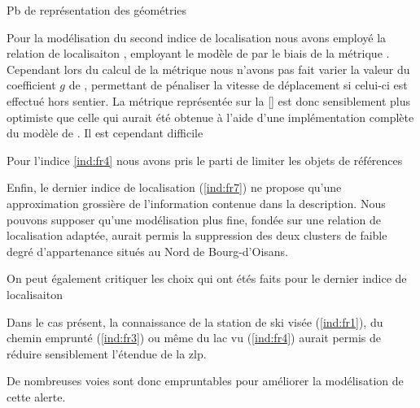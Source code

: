 Pb de représentation des géométries

Pour la modélisation du second indice de localisation nous avons
employé la relation de localisaiton
, employant le modèle de
\textcite{Tobler1993} par le biais de la métrique
. Cependant lors du calcul de la métrique
nous n'avons pas fait varier la valeur du coefficient \(g\) de
\textcite{Tobler1993}, permettant de pénaliser la vitesse de
déplacement si celui-ci est effectué hors sentier. La métrique
représentée sur la \autoref{} est donc sensiblement plus optimiste que
celle qui aurait été obtenue à l'aide d'une implémentation complète du
modèle de \textcite{Tobler1993}.
%
Il est cependant difficile

Pour l'indice \ref{ind:fr4} nous avons pris le parti de limiter les
objets de références

Enfin, le dernier indice de localisation (\ref{ind:fr7}) ne propose
qu'une approximation grossière de l'information contenue dans la
description.
%
Nous pouvons supposer qu'une modélisation plus fine, fondée sur une
relation de localisation adaptée, aurait permis la suppression des
deux clusters de faible degré d'appartenance situés au Nord de
Bourg-d'Oisans.


On peut également critiquer les choix qui ont étés faits pour le
dernier indice de localisaiton

Dans le cas présent, la connaissance de la station de ski visée
(\ref{ind:fr1}), du chemin emprunté (\ref{ind:fr3}) ou même du lac vu
(\ref{ind:fr4}) aurait permis de réduire sensiblement l'étendue de la
\ac{zlp}.

De nombreuses voies sont donc empruntables pour améliorer la
modélisation de cette alerte.

